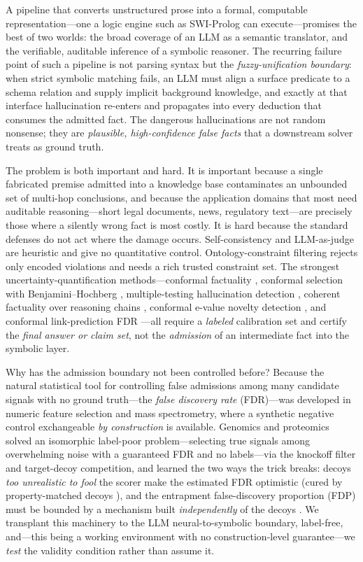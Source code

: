 \documentclass[11pt,letterpaper]{article}
\begin{document}
A pipeline that converts unstructured prose into a formal, computable representation---one a logic engine such as SWI-Prolog can execute---promises the best of two worlds: the broad coverage of an LLM as a semantic translator, and the verifiable, auditable inference of a symbolic reasoner. The recurring failure point of such a pipeline is not parsing syntax but the \emph{fuzzy-unification boundary}: when strict symbolic matching fails, an LLM must align a surface predicate to a schema relation and supply implicit background knowledge, and exactly at that interface hallucination re-enters and propagates into every deduction that consumes the admitted fact. The dangerous hallucinations are not random nonsense; they are \emph{plausible, high-confidence false facts} that a downstream solver treats as ground truth.

The problem is both important and hard. It is important because a single fabricated premise admitted into a knowledge base contaminates an unbounded set of multi-hop conclusions, and because the application domains that most need auditable reasoning---short legal documents, news, regulatory text---are precisely those where a silently wrong fact is most costly. It is hard because the standard defenses do not act where the damage occurs. Self-consistency and LLM-as-judge are heuristic and give no quantitative control. Ontology-constraint filtering rejects only encoded violations and needs a rich trusted constraint set. The strongest uncertainty-quantification methods---conformal factuality \cite{Mohri2024}, conformal selection with Benjamini--Hochberg \cite{Jin2022}, multiple-testing hallucination detection \cite{Li2025}, coherent factuality over reasoning chains \cite{RubinToles2025}, conformal e-value novelty detection \cite{Bashari2023}, and conformal link-prediction FDR \cite{Marandon2023}---all require a \emph{labeled} calibration set and certify the \emph{final answer or claim set}, not the \emph{admission} of an intermediate fact into the symbolic layer.

Why has the admission boundary not been controlled before? Because the natural statistical tool for controlling false admissions among many candidate signals with no ground truth---the \emph{false discovery rate} (FDR)---was developed in numeric feature selection and mass spectrometry, where a synthetic negative control exchangeable \emph{by construction} is available. Genomics and proteomics solved an isomorphic label-poor problem---selecting true signals among overwhelming noise with a guaranteed FDR and no labels---via the knockoff filter \cite{Barber2015, Cands2016} and target-decoy competition, and learned the two ways the trick breaks: decoys \emph{too unrealistic to fool} the scorer make the estimated FDR optimistic (cured by property-matched decoys \cite{Imrie2020}), and the entrapment false-discovery proportion (FDP) must be bounded by a mechanism built \emph{independently} of the decoys \cite{Wen2024}. We transplant this machinery to the LLM neural-to-symbolic boundary, label-free, and---this being a working environment with no construction-level guarantee---we \emph{test} the validity condition rather than assume it.
\end{document}
